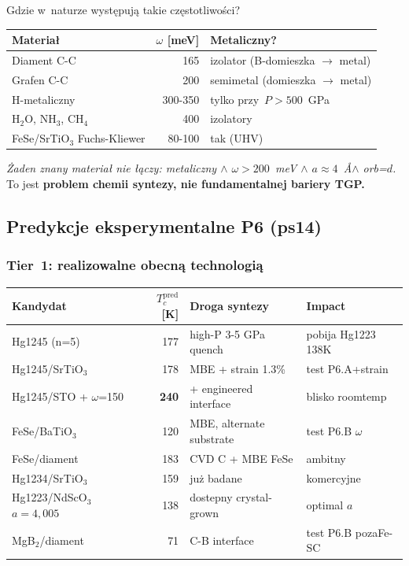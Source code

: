 Gdzie w~naturze wyst\k{e}puj\k{a} takie cz\k{e}stotliwo\'sci?

\begin{center}
\begin{tabular}{lrl}
\toprule
Materia\l{} & $\omega$ [meV] & Metaliczny? \\
\midrule
Diament C-C & 165 & izolator (B-domieszka $\to$ metal) \\
Grafen C-C & 200 & semimetal (domieszka $\to$ metal) \\
H-metaliczny & 300-350 & tylko przy~$P>500$~GPa \\
H$_2$O, NH$_3$, CH$_4$ & 400 & izolatory \\
FeSe/SrTiO$_3$ Fuchs-Kliewer & 80-100 & tak (UHV) \\
\bottomrule
\end{tabular}
\end{center}

\noindent \emph{\.Zaden znany materia\l{} nie \l{}\k{a}czy: metaliczny
$\land$ $\omega>200$~meV $\land$ $a\approx 4$~\AA $\land$ orb=$d$.}
To jest \textbf{problem chemii syntezy, nie fundamentalnej bariery TGP.}

\subsection{Predykcje eksperymentalne P6 (ps14)}
\label{sec:P6-predictions}

\subsubsection{Tier~1: realizowalne obecn\k{a} technologi\k{a}}

\begin{center}
\small
\begin{tabular}{lrll}
\toprule
Kandydat & $T_c^\text{pred}$ [K] & Droga syntezy & Impact \\
\midrule
Hg1245 (n=5) & 177 & high-P 3-5 GPa quench & pobija Hg1223 138K \\
Hg1245/SrTiO$_3$ & 178 & MBE + strain 1.3\% & test P6.A+strain \\
Hg1245/STO + $\omega$=150 & \textbf{240} & + engineered interface & blisko roomtemp \\
FeSe/BaTiO$_3$ & 120 & MBE, alternate substrate & test P6.B $\omega$ \\
FeSe/diament & 183 & CVD C + MBE FeSe & ambitny \\
Hg1234/SrTiO$_3$ & 159 & ju\.z badane & komercyjne \\
Hg1223/NdScO$_3$ $a=4{,}005$ & 138 & dostepny crystal-grown & optimal $a$ \\
MgB$_2$/diament & 71 & C-B interface & test P6.B pozaFe-SC \\
\bottomrule
\end{tabular}
\end{center}

